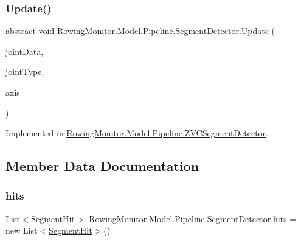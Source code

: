 \mbox{\label{class_rowing_monitor_1_1_model_1_1_pipeline_1_1_segment_detector_a24dcb2926660a6218af3052f147d82da}} 
\subsubsection{\texorpdfstring{Update()}{Update()}}
{\footnotesize\ttfamily abstract void Rowing\+Monitor.\+Model.\+Pipeline.\+Segment\+Detector.\+Update (\begin{DoxyParamCaption}\item[{\hyperlink{struct_rowing_monitor_1_1_model_1_1_util_1_1_joint_data}{Joint\+Data}}]{joint\+Data,  }\item[{Joint\+Type}]{joint\+Type,  }\item[{String}]{axis }\end{DoxyParamCaption})\hspace{0.3cm}{\ttfamily [pure virtual]}}



Implemented in \hyperlink{class_rowing_monitor_1_1_model_1_1_pipeline_1_1_z_v_c_segment_detector_a81c28e4ede1561c2fe1eca29f63f0767}{Rowing\+Monitor.\+Model.\+Pipeline.\+Z\+V\+C\+Segment\+Detector}.



\subsection{Member Data Documentation}
\mbox{\label{class_rowing_monitor_1_1_model_1_1_pipeline_1_1_segment_detector_a567492ea6e393bed7c946359cdf7c866}} 
\subsubsection{\texorpdfstring{hits}{hits}}
{\footnotesize\ttfamily List$<$\hyperlink{struct_rowing_monitor_1_1_model_1_1_util_1_1_segment_hit}{Segment\+Hit}$>$ Rowing\+Monitor.\+Model.\+Pipeline.\+Segment\+Detector.\+hits = new List$<$\hyperlink{struct_rowing_monitor_1_1_model_1_1_util_1_1_segment_hit}{Segment\+Hit}$>$()\hspace{0.3cm}{\ttfamily [protected]}}




